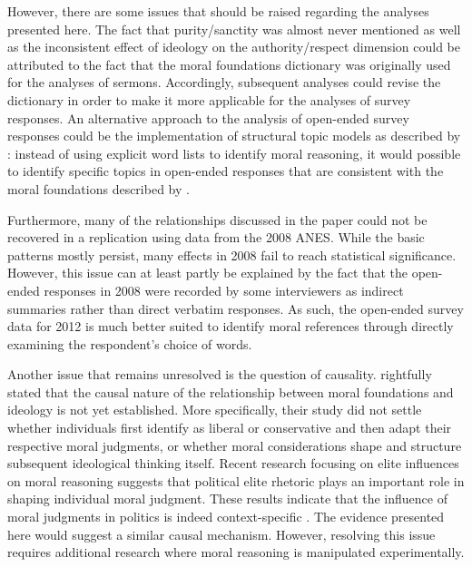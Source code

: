 \documentclass[12pt]{article}
\begin{document}
However, there are some issues that should be raised regarding the analyses presented here. The fact that purity/sanctity was almost never mentioned as well as the inconsistent effect of ideology on the authority/respect dimension could be attributed to the fact that the moral foundations dictionary was originally used for the analyses of sermons. Accordingly, subsequent analyses could revise the dictionary in order to make it more applicable for the analyses of survey responses. An alternative approach to the analysis of open-ended survey responses could be the implementation of structural topic models as described by \citet{roberts2014structural}: instead of using explicit word lists to identify moral reasoning, it would possible to identify specific topics in open-ended responses that are consistent with the moral foundations described by \citet{haidt2008moral} \citep[see also][]{lin2008joint}.

Furthermore, many of the relationships discussed in the paper could not be recovered in a replication using data from the 2008 ANES. While the basic patterns mostly persist, many effects in 2008 fail to reach statistical significance. However, this issue can at least partly be explained by the fact that the open-ended responses in 2008 were recorded by some interviewers as indirect summaries rather than direct verbatim responses. As such, the open-ended survey data for 2012 is much better suited to identify moral references through directly examining the respondent's choice of words.

Another issue that remains unresolved is the question of causality. \citet{graham2009liberals} rightfully stated that the causal nature of the relationship between moral foundations and ideology is not yet established. More specifically, their study did not settle whether individuals first identify as liberal or conservative and then adapt their respective moral judgments, or whether moral considerations shape and structure subsequent ideological thinking itself. Recent research focusing on elite influences on moral reasoning suggests that political elite rhetoric plays an important role in shaping individual moral judgment. These results indicate that the influence of moral judgments in politics is indeed context-specific \citep[see for example][]{clifford2013words,clifford2015concerns}. The evidence presented here would suggest a similar causal mechanism. However, resolving this issue requires additional research where moral reasoning is manipulated experimentally.
\end{document}
